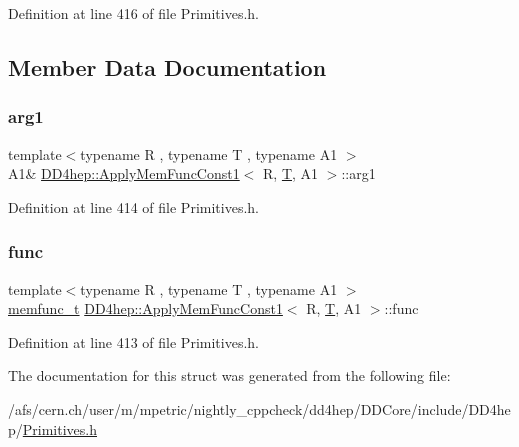 Definition at line 416 of file Primitives.\+h.



\subsection{Member Data Documentation}
\hypertarget{struct_d_d4hep_1_1_apply_mem_func_const1_a3bcafdc6a0f9deeb47c46e2a10b4fbe2}{}\label{struct_d_d4hep_1_1_apply_mem_func_const1_a3bcafdc6a0f9deeb47c46e2a10b4fbe2} 
\subsubsection{\texorpdfstring{arg1}{arg1}}
{\footnotesize\ttfamily template$<$typename R , typename T , typename A1 $>$ \\
A1\& \hyperlink{struct_d_d4hep_1_1_apply_mem_func_const1}{D\+D4hep\+::\+Apply\+Mem\+Func\+Const1}$<$ R, \hyperlink{class_t}{T}, A1 $>$\+::arg1}



Definition at line 414 of file Primitives.\+h.

\hypertarget{struct_d_d4hep_1_1_apply_mem_func_const1_a924d23a16a5ec30552a0f78bcc3dee14}{}\label{struct_d_d4hep_1_1_apply_mem_func_const1_a924d23a16a5ec30552a0f78bcc3dee14} 
\subsubsection{\texorpdfstring{func}{func}}
{\footnotesize\ttfamily template$<$typename R , typename T , typename A1 $>$ \\
\hyperlink{struct_d_d4hep_1_1_apply_mem_func_const1_ac708abd841ccaac1d1f920a5139b68ce}{memfunc\+\_\+t} \hyperlink{struct_d_d4hep_1_1_apply_mem_func_const1}{D\+D4hep\+::\+Apply\+Mem\+Func\+Const1}$<$ R, \hyperlink{class_t}{T}, A1 $>$\+::func}



Definition at line 413 of file Primitives.\+h.



The documentation for this struct was generated from the following file\+:\begin{DoxyCompactItemize}
\item 
/afs/cern.\+ch/user/m/mpetric/nightly\+\_\+cppcheck/dd4hep/\+D\+D\+Core/include/\+D\+D4hep/\hyperlink{_primitives_8h}{Primitives.\+h}\end{DoxyCompactItemize}
